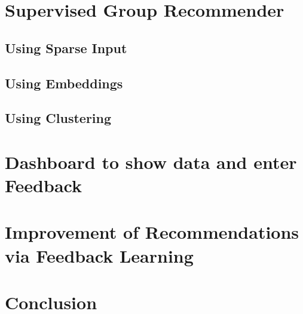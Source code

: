 \section{Supervised Group Recommender}

\subsection{Using Sparse Input}

\subsection{Using Embeddings}

\subsection{Using Clustering}

\section{Dashboard to show data and enter Feedback}

\section{Improvement of Recommendations via Feedback Learning}

\section{Conclusion}
